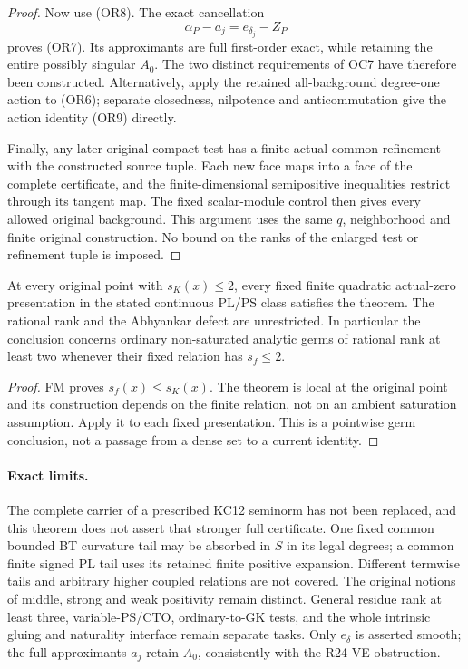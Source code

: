 \begin{proof}
Now use (OR8). The exact cancellation
\[
                         \alpha_P-a_j=e_{\delta_j}-Z_P
\tag{OR15}
\]
proves (OR7). Its approximants are full first-order exact, while
retaining the entire possibly singular \(A_0\). The two distinct
requirements of OC7 have therefore been constructed. Alternatively,
apply the retained all-background degree-one action to (OR6);
separate closedness, nilpotence and anticommutation give the action
identity (OR9) directly.

Finally, any later original compact test has a finite actual common
refinement with the constructed source tuple. Each new face maps
into a face of the complete certificate, and the finite-dimensional
semipositive inequalities restrict through its tangent map. The
fixed scalar-module control then gives every allowed original
background. This argument uses the same \(q\), neighborhood and
finite original construction. No bound on the ranks of the enlarged
test or refinement tuple is imposed.
\end{proof}

\begin{corollary}
\label{cor:r11-intrinsic-residue-two-locus}
At every original point with \(s_K(x)\le2\), every fixed finite
quadratic actual-zero presentation in the stated continuous PL/PS
class satisfies the theorem. The rational rank and the Abhyankar
defect are unrestricted. In particular the conclusion concerns
ordinary non-saturated analytic germs of rational rank at least
two whenever their fixed relation has \(s_f\le2\).
\end{corollary}
\begin{proof}
FM proves \(s_f(x)\le s_K(x)\). The theorem is local at the
original point and its construction depends on the finite relation,
not on an ambient saturation assumption. Apply it to each fixed
presentation. This is a pointwise germ conclusion, not a passage
from a dense set to a current identity.
\end{proof}

\paragraph{Exact limits.}
The complete carrier of a prescribed KC12 seminorm has not been
replaced, and this theorem does not assert that stronger full
certificate. One fixed common bounded BT curvature tail may be
absorbed in \(S\) in its legal degrees; a common finite signed PL
tail uses its retained finite positive expansion. Different termwise
tails and arbitrary higher coupled relations are not covered.
The original notions of middle, strong and weak positivity remain
distinct. General residue rank at least three, variable-PS/CTO,
ordinary-to-GK tests, and the whole intrinsic gluing and naturality
interface remain separate tasks. Only \(e_\delta\) is asserted
smooth; the full approximants \(a_j\) retain \(A_0\), consistently
with the R24 VE obstruction.

